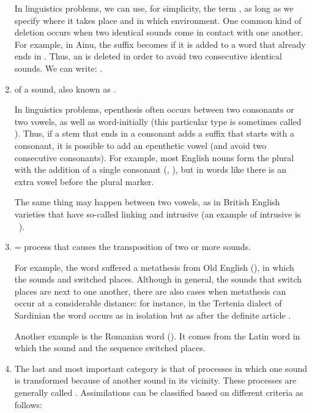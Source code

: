 \begin{refsection}
\begin{enumerate}
In linguistics problems, we can use, for simplicity, the term , as long as we specify where it takes place and in which environment. One common kind of deletion occurs when two identical sounds come in contact with one another. For example, in Ainu, the suffix  becomes  if it is added to a word that already ends in . Thus, an  is deleted in order to avoid two consecutive identical sounds. We can write: .
\item  {} of a sound, also known as .

In linguistics problems, epenthesis often occurs between two consonants or two vowels, as well as word-initially (this particular type is sometimes called ). Thus, if a stem that ends in a consonant adds a suffix that starts with a consonant, it is possible to add an epenthetic vowel (and avoid two consecutive consonants). For example, most English nouns form the plural with the addition of a single consonant (, ), but in words like  there is an extra vowel before the plural marker.

The same thing may happen between two vowels, as in British English varieties that have so-called linking and intrusive  (an example of intrusive  is  \rightarrow~).
\item\sloppy  {} = process that causes the transposition of two or more sounds.

For example, the word  suffered a metathesis from Old English (), in which the sounds  and  switched places. Although in general, the sounds that switch places are next to one another, there are also cases when metathesis can occur at a considerable distance: for instance, in the Tertenia dialect of Sardinian the word  occurs as  in isolation but as  after the definite article .

Another example is the Romanian word  (). It comes from the Latin word  in which the sound  and the sequence  switched places.
\item The last and most important category is that of processes in which one sound is transformed because of another sound in its vicinity. These processes are generally called . Assimilations can be classified based on different criteria as follows:\largerpage


\end{enumerate}
\end{refsection}
